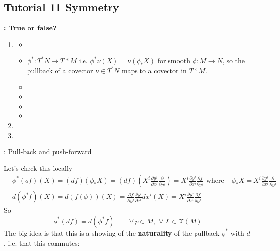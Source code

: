 	\subsection*{Tutorial 11 Symmetry }
	
	\textbf{: True or false?}
	
	\begin{enumerate}
		\item[(a)]
		\begin{itemize}
			\item
			\item $\phi^*:T^*N \to T*M$ i.e. $\phi^*\nu(X) = \nu(\phi_*X)$ for smooth $\phi:M \to N$, so the pullback of a covector $\nu \in T^*N$ maps to a covector in $T*M$.  
			\item
			\item
			\item
			\item
		\end{itemize}
		\item[(b)]
		\item[(c)]
	\end{enumerate}
	
	: Pull-back and push-forward
	
	\questionhead{}Let's check this locally
	\[
	\begin{aligned}
	& \phi^*(df)(X) = (df)(\phi_*X) = (df)(X^i \frac{ \partial y^j}{\partial x^i} \frac{ \partial }{ \partial y^j}  ) = X^i \frac{ \partial y^j}{ \partial x^i} \frac{ \partial f}{ \partial y^j} \text{ where } 
	& \phi_* X = X^i \frac{ \partial y^j}{ \partial x^i} \frac{ \partial }{ \partial y^j} \\ 
	& d(\phi^*f)(X) = d(f(\phi))(X) = \frac{ \partial f}{ \partial y^j} \frac{ \partial y^j}{ \partial x^i } dx^i(X) = X^i \frac{ \partial y^j}{ \partial x^i} \frac{ \partial f}{ \partial y^j}
	\end{aligned}
	\]
	So 
	\[
	\boxed{ \phi^*(df) = d(\phi^* f)  } \quad \quad \, \forall \, p \in M , \, \, \forall \, X \in \mathfrak{X}(M)
	\]
	The big idea is that this is a showing of the \textbf{naturality} of the pullback $\phi^*$ with $d$, i.e. that this commutes:
	
	
